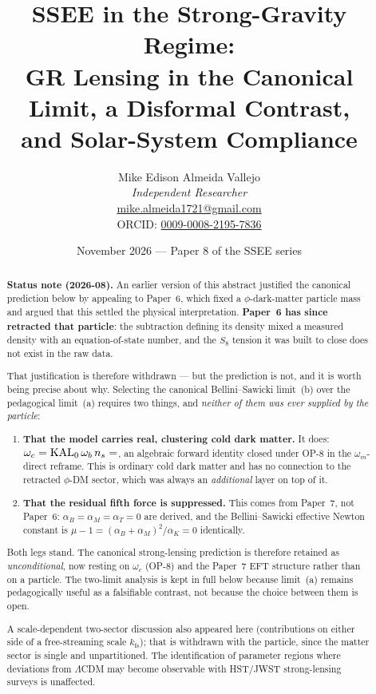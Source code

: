 \documentclass[12pt,a4paper]{article}
\title{\textbf{SSEE in the Strong-Gravity Regime:\\
       GR Lensing in the Canonical Limit, a Disformal Contrast,\\
       and Solar-System Compliance}}
\author{Mike Edison Almeida Vallejo \\
\small \textit{Independent Researcher} \\
\small \href{mailto:mike.almeida1721@gmail.com}{mike.almeida1721@gmail.com} \\
\small ORCID: \href{https://orcid.org/0009-0008-2195-7836}{0009-0008-2195-7836}
}
\date{November 2026 --- Paper 8 of the SSEE series}
\begin{document}
\maketitle

\begin{abstract}
\noindent \textbf{Status note (2026-08).} An earlier version of this abstract
justified the canonical prediction below by appealing to Paper~6, which fixed
a $\phi$-dark-matter particle mass and argued that this settled the physical
interpretation. \textbf{Paper~6 has since retracted that particle}: the
subtraction defining its density mixed a measured density with an
equation-of-state number, and the $S_8$ tension it was built to close does not
exist in the raw data.

That justification is therefore withdrawn --- but the prediction is not, and it
is worth being precise about why. Selecting the canonical Bellini--Sawicki
limit~(b) over the pedagogical limit~(a) requires two things, and \emph{neither
of them was ever supplied by the particle}:

\begin{enumerate}\itemsep2pt
  \item \textbf{That the model carries real, clustering cold dark matter.} It
        does: $\omega_c=\mathrm{KAL}_0\,\omega_b\,n_s=\val{OMEGA_C_H2_d6}$, an algebraic
        forward identity closed under OP-8 in the $\omega_m$-direct reframe.
        This is ordinary cold dark matter and has no connection to the
        retracted $\phi$-DM sector, which was always an \emph{additional} layer
        on top of it.
  \item \textbf{That the residual fifth force is suppressed.} This comes from
        Paper~7, not Paper~6: $\alpha_B=\alpha_M=\alpha_T=0$ are derived, and
        the Bellini--Sawicki effective Newton constant is
        $\mu-1=(\alpha_B+\alpha_M)^2/\alpha_K=0$ identically.
\end{enumerate}

Both legs stand. The canonical strong-lensing prediction is therefore retained
as \emph{unconditional}, now resting on $\omega_c$ (OP-8) and the Paper~7 EFT
structure rather than on a particle. The two-limit analysis is kept in full
below because limit~(a) remains pedagogically useful as a falsifiable contrast,
not because the choice between them is open.

A scale-dependent two-sector discussion also appeared here (contributions on
either side of a free-streaming scale $k_{\mathrm{fs}}$); that is withdrawn with
the particle, since the matter sector is single and unpartitioned. The
identification of parameter regions where deviations from $\Lambda$CDM may
become observable with HST/JWST strong-lensing surveys is unaffected.
\end{abstract}
\end{document}
